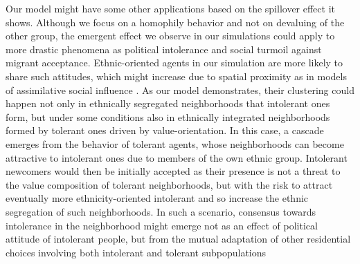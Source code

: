 \documentclass{ws-acs}
\begin{document}
Our model might have some other applications based on the spillover effect it shows. Although we focus on a homophily behavior and not on devaluing of the other group, the emergent effect we observe in our simulations could apply to more drastic phenomena as political intolerance and social turmoil against migrant acceptance. Ethnic-oriented agents in our simulation are more likely to share such attitudes, which might increase due to spatial proximity as in models of assimilative social influence \cite{flache2017}. As our model demonstrates, their clustering could happen not only in ethnically segregated neighborhoods that intolerant ones form, but under some conditions also in ethnically integrated neighborhoods formed by tolerant ones driven by value-orientation. In this case, a cascade emerges from the behavior of tolerant agents, whose neighborhoods can become attractive to intolerant ones due to members of the own ethnic group. Intolerant newcomers would then be initially accepted as their presence is not a threat to the value composition of tolerant neighborhoods, but with the risk to attract eventually more ethnicity-oriented intolerant and so increase the ethnic segregation of such neighborhoods. In such a scenario, consensus towards intolerance in the neighborhood might emerge not as an effect of political attitude of intolerant people, but from the mutual adaptation of other residential choices involving both intolerant and tolerant subpopulations



\end{document}
